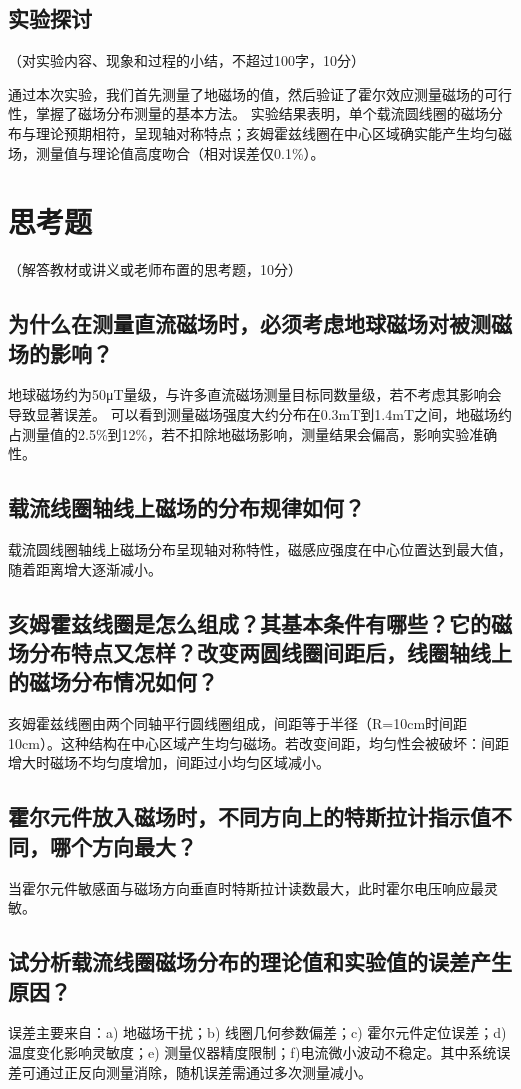\documentclass[10pt,a4paper]{ctexart}
\newcommand{\xiaosi}{\fontsize{12pt}{16pt}\selectfont}
\begin{document}
    \subsection{实验探讨}
    \xiaosi （对实验内容、现象和过程的小结，不超过100字，10分）
    
通过本次实验，我们首先测量了地磁场的值，然后验证了霍尔效应测量磁场的可行性，掌握了磁场分布测量的基本方法。
实验结果表明，单个载流圆线圈的磁场分布与理论预期相符，呈现轴对称特点；亥姆霍兹线圈在中心区域确实能产生均匀磁场，测量值与理论值高度吻合（相对误差仅0.1\%）。
\section{思考题}

    \xiaosi （解答教材或讲义或老师布置的思考题，10分）
\subsection{为什么在测量直流磁场时，必须考虑地球磁场对被测磁场的影响？}
地球磁场约为50μT量级，与许多直流磁场测量目标同数量级，若不考虑其影响会导致显著误差。
可以看到测量磁场强度大约分布在0.3mT到1.4mT之间，地磁场约占测量值的2.5\%到12\%，若不扣除地磁场影响，测量结果会偏高，影响实验准确性。
\subsection{载流线圈轴线上磁场的分布规律如何？}
载流圆线圈轴线上磁场分布呈现轴对称特性，磁感应强度在中心位置达到最大值，随着距离增大逐渐减小。
\subsection{亥姆霍兹线圈是怎么组成？其基本条件有哪些？它的磁场分布特点又怎样？改变两圆线圈间距后，线圈轴线上的磁场分布情况如何？}
亥姆霍兹线圈由两个同轴平行圆线圈组成，间距等于半径（R=10cm时间距10cm）。这种结构在中心区域产生均匀磁场。若改变间距，均匀性会被破坏：间距增大时磁场不均匀度增加，间距过小均匀区域减小。
\subsection{霍尔元件放入磁场时，不同方向上的特斯拉计指示值不同，哪个方向最大？}
当霍尔元件敏感面与磁场方向垂直时特斯拉计读数最大，此时霍尔电压响应最灵敏。
\subsection{试分析载流线圈磁场分布的理论值和实验值的误差产生原因？}
误差主要来自：a) 地磁场干扰；b) 线圈几何参数偏差；c) 霍尔元件定位误差；d) 温度变化影响灵敏度；e) 测量仪器精度限制；f)电流微小波动不稳定。其中系统误差可通过正反向测量消除，随机误差需通过多次测量减小。
\newpage
\end{document}
